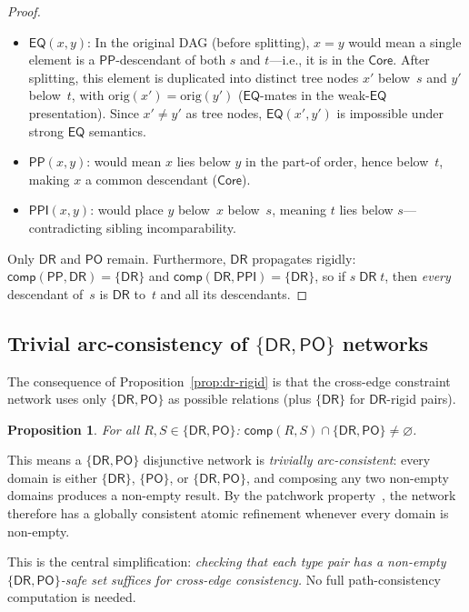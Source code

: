 \documentclass[
]{ceurart}
\newtheorem{proposition}[theorem]{Proposition}
\theoremstyle{definition}
\newcommand{\DR}{\ensuremath{\mathsf{DR}}}
\newcommand{\PO}{\ensuremath{\mathsf{PO}}}
\newcommand{\EQ}{\ensuremath{\mathsf{EQ}}}
\newcommand{\PP}{\ensuremath{\mathsf{PP}}}
\newcommand{\PPI}{\ensuremath{\mathsf{PPI}}}
\newcommand{\comp}{\ensuremath{\mathsf{comp}}}
\newcommand{\Core}{\ensuremath{\mathsf{Core}}}
\begin{document}
\begin{proof}
\begin{itemize}[nosep]
  \item $\EQ(x,y)$: In the original DAG (before splitting),
    $x = y$ would mean a single element is a $\PP$-descendant of
    both $s$ and $t$---i.e., it is in the $\Core$.
    After splitting, this element is duplicated into
    distinct tree nodes $x'$ below~$s$ and $y'$ below~$t$,
    with $\mathrm{orig}(x') = \mathrm{orig}(y')$
    ($\EQ$-mates in the weak-$\EQ$ presentation).
    Since $x' \neq y'$ as tree nodes, $\EQ(x',y')$ is
    impossible under strong $\EQ$ semantics.
  \item $\PP(x,y)$: would mean $x$ lies below $y$ in the part-of
    order, hence below~$t$, making $x$ a common descendant
    ($\Core$).
  \item $\PPI(x,y)$: would place $y$ below~$x$ below~$s$, meaning
    $t$ lies below $s$---contradicting sibling incomparability.
\end{itemize}
Only $\DR$ and $\PO$ remain.  Furthermore, $\DR$ propagates
rigidly: $\comp(\PP, \DR) = \{\DR\}$ and $\comp(\DR, \PPI) = \{\DR\}$,
so if $s \;\DR\; t$, then \emph{every} descendant of~$s$ is $\DR$
to~$t$ and all its descendants.
\end{proof}

\subsection{Trivial arc-consistency of $\{\DR,\PO\}$ networks}

The consequence of Proposition~\ref{prop:dr-rigid} is that the
cross-edge constraint network uses only $\{\DR, \PO\}$ as possible
relations (plus $\{\DR\}$ for $\DR$-rigid pairs).

\begin{proposition}
\label{prop:drpo-arc}
For all $R, S \in \{\DR, \PO\}$:
$\comp(R, S) \cap \{\DR, \PO\} \neq \varnothing$.
\end{proposition}

This means a $\{\DR,\PO\}$ disjunctive network is
\emph{trivially arc-consistent}: every domain is either
$\{\DR\}$, $\{\PO\}$, or $\{\DR,\PO\}$, and composing any two
non-empty domains produces a non-empty result.
By the patchwork property~\cite{RenzNebel1999}, the network
therefore has a globally consistent atomic refinement whenever
every domain is non-empty.

This is the central simplification: \emph{checking that each type
pair has a non-empty $\{\DR,\PO\}$-safe set suffices for
cross-edge consistency.}  No full path-consistency computation is
needed.
\end{document}
